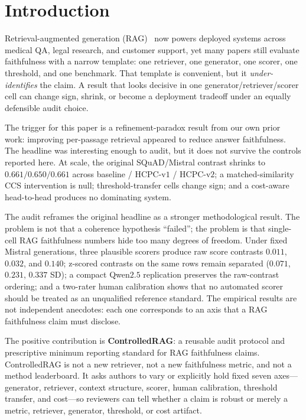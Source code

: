 \section{Introduction}
\label{sec:intro}

Retrieval-augmented generation (RAG)~\citep{lewis2020rag} now powers
deployed systems across medical QA, legal research, and customer
support, yet many papers still evaluate faithfulness with a narrow
template: one retriever, one generator, one scorer, one threshold, and
one benchmark. That template is convenient, but it
\emph{under-identifies} the claim. A result that looks decisive in one
generator/retriever/scorer cell can change sign, shrink, or become a
deployment tradeoff under an equally defensible audit choice.

The trigger for this paper is a refinement-paradox result from our own
prior work: improving per-passage retrieval appeared to reduce answer
faithfulness. The headline was interesting enough to audit, but it does
not survive the controls reported here. At scale, the original
SQuAD/Mistral contrast shrinks to $0.661 / 0.650 / 0.661$ across
baseline / HCPC-v$1$ / HCPC-v$2$; a matched-similarity CCS intervention
is null; threshold-transfer cells change sign; and a cost-aware
head-to-head produces no dominating system.

The audit reframes the original headline as a stronger
methodological result. The problem is not that a coherence hypothesis
``failed''; the problem is that single-cell RAG faithfulness numbers
hide too many degrees of freedom. Under fixed Mistral generations,
three plausible scorers produce raw score contrasts $0.011$, $0.032$,
and $0.140$; z-scored contrasts on the same rows remain separated
($0.071$, $0.231$, $0.337$ SD); a compact Qwen$2.5$ replication
preserves the raw-contrast ordering; and a
two-rater human calibration shows that no automated scorer should be
treated as an unqualified reference standard. The empirical results are not
independent anecdotes: each one corresponds to an axis that a RAG
faithfulness claim must disclose.

The positive contribution is \textbf{ControlledRAG}: a reusable audit
protocol and prescriptive minimum reporting standard for RAG
faithfulness claims. ControlledRAG is not a new retriever, not a new
faithfulness metric, and not a method leaderboard. It asks authors to
vary or explicitly hold fixed seven axes---generator, retriever,
context structure, scorer, human calibration, threshold transfer, and
cost---so reviewers can tell whether a claim is robust or merely a
metric, retriever, generator, threshold, or cost artifact.

